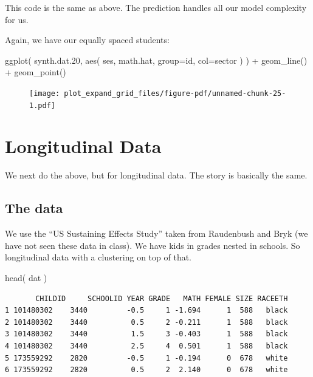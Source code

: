 \documentclass[
  letterpaper,
  DIV=11,
  numbers=noendperiod]{scrreprt}
\newenvironment{Shaded}{\begin{snugshade}}{\end{snugshade}}
\newcommand{\AttributeTok}[1]{\textcolor[rgb]{0.49,0.56,0.16}{#1}}
\newcommand{\FloatTok}[1]{\textcolor[rgb]{0.25,0.63,0.44}{#1}}
\newcommand{\FunctionTok}[1]{\textcolor[rgb]{0.02,0.16,0.49}{#1}}
\newcommand{\NormalTok}[1]{\textcolor[rgb]{0.00,0.44,0.13}{#1}}
\newcommand{\SpecialCharTok}[1]{\textcolor[rgb]{0.25,0.44,0.63}{#1}}
\begin{document}
This code is the same as above. The prediction handles all our model
complexity for us.

Again, we have our equally spaced students:

\begin{Shaded}
\begin{Highlighting}[]
\FunctionTok{ggplot}\NormalTok{( synth.dat}\FloatTok{.20}\NormalTok{, }\FunctionTok{aes}\NormalTok{( ses, math.hat, }\AttributeTok{group=}\NormalTok{id, }\AttributeTok{col=}\NormalTok{sector ) ) }\SpecialCharTok{+}
  \FunctionTok{geom\_line}\NormalTok{() }\SpecialCharTok{+}
  \FunctionTok{geom\_point}\NormalTok{()}
\end{Highlighting}
\end{Shaded}

\begin{figure}[H]

{\centering \texttt{[image: plot\_expand\_grid\_files/figure-pdf/unnamed-chunk-25-1.pdf]}

}

\end{figure}

\hypertarget{longitudinal-data-1}{%
\section{Longitudinal Data}\label{longitudinal-data-1}}

We next do the above, but for longitudinal data. The story is basically
the same.

\hypertarget{the-data}{%
\subsection{The data}\label{the-data}}

We use the ``US Sustaining Effects Study'' taken from Raudenbush and
Bryk (we have not seen these data in class). We have kids in grades
nested in schools. So longitudinal data with a clustering on top of
that.

\begin{Shaded}
\begin{Highlighting}[]
\FunctionTok{head}\NormalTok{( dat )}
\end{Highlighting}
\end{Shaded}

\begin{verbatim}
       CHILDID     SCHOOLID YEAR GRADE   MATH FEMALE SIZE RACEETH
1 101480302    3440         -0.5     1 -1.694      1  588   black
2 101480302    3440          0.5     2 -0.211      1  588   black
3 101480302    3440          1.5     3 -0.403      1  588   black
4 101480302    3440          2.5     4  0.501      1  588   black
5 173559292    2820         -0.5     1 -0.194      0  678   white
6 173559292    2820          0.5     2  2.140      0  678   white
\end{verbatim}
\end{document}
